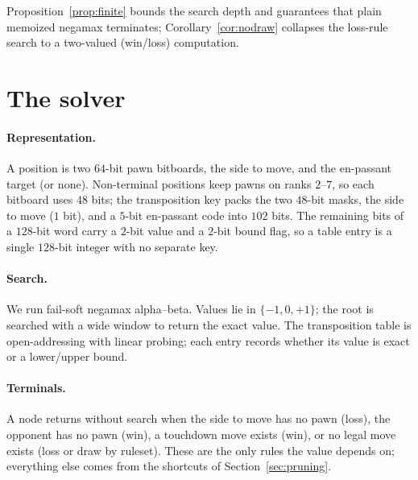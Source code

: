 \documentclass[Afour,sageapa,times]{sagej}
\theoremstyle{plain}
\theoremstyle{definition}
\begin{document}
Proposition~\ref{prop:finite} bounds the search depth and guarantees that plain
memoized negamax terminates; Corollary~\ref{cor:nodraw} collapses the loss-rule
search to a two-valued (win/loss) computation.

\section{The solver}\label{sec:solver}

\paragraph{Representation.} A position is two $64$-bit pawn bitboards, the side to
move, and the en-passant target (or none). Non-terminal positions keep pawns on
ranks $2$--$7$, so each bitboard uses $48$ bits; the transposition key packs the
two $48$-bit masks, the side to move ($1$ bit), and a $5$-bit en-passant code
into $102$ bits. The remaining bits of a $128$-bit word carry a $2$-bit value and
a $2$-bit bound flag, so a table entry is a single $128$-bit integer with no
separate key.

\paragraph{Search.} We run fail-soft negamax alpha--beta. Values lie in
$\{-1,0,+1\}$; the root is searched with a wide window to return the exact value.
The transposition table is open-addressing with linear probing; each entry
records whether its value is exact or a lower/upper bound.

\paragraph{Terminals.} A node returns without search when the side to move has no
pawn (loss), the opponent has no pawn (win), a touchdown move exists (win), or no
legal move exists (loss or draw by ruleset). These are the only rules the value
depends on; everything else comes from the shortcuts of Section~\ref{sec:pruning}.
\end{document}
